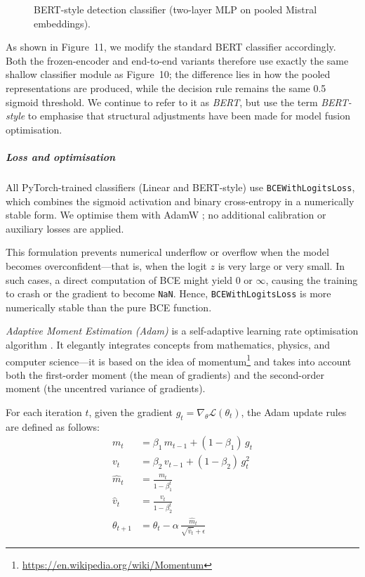 \documentclass[12pt]{article}
\begin{document}
\begin{figure}[H]
\begin{minipage}{1\textwidth}
\begin{adjustwidth}{-2.5cm}{0cm}
\begin{tikzpicture}[node distance=16mm and 22mm, scale=0.9, every node/.style={transform shape}]
\end{tikzpicture}
\end{adjustwidth}
\end{minipage}
\caption{BERT-style detection classifier (two-layer MLP on pooled Mistral embeddings).}
\label{fig:bert-detect-classifier}
\end{figure}

As shown in Figure~11, we modify the standard BERT classifier accordingly. 
Both the frozen-encoder and end-to-end variants therefore use exactly the same shallow classifier module as Figure~10; the difference lies in how the pooled representations are produced, while the decision rule remains the same 0.5 sigmoid threshold.
We continue to refer to it as \textit{BERT}, but use the term \textit{BERT-style} to emphasise that structural adjustments have been made for model fusion optimisation.

\subparagraph{Loss and optimisation}

All PyTorch-trained classifiers (Linear and BERT-style) use \texttt{BCEWithLogitsLoss}, which combines the sigmoid activation and binary cross-entropy in a numerically stable form. 
We optimise them with AdamW \cite{paszke2019pytorch,loshchilov2019adamw}; no additional calibration or auxiliary losses are applied.

This formulation prevents numerical underflow or overflow when the model becomes overconfident\;---\;that is, when the logit $z$ is very large or very small. In such cases, a direct computation of BCE might yield $0$ or $\infty$, causing the training to crash or the gradient to become \texttt{NaN}. Hence, \texttt{BCEWithLogitsLoss} is more numerically stable than the pure BCE function.

\textit{Adaptive Moment Estimation (Adam)} is a self-adaptive learning rate optimisation algorithm \cite{kingma2014adam}. It elegantly integrates concepts from mathematics, physics, and computer science\;---\;it is based on the idea of momentum\footnote{\url{https://en.wikipedia.org/wiki/Momentum}} and takes into account both the first-order moment (the mean of gradients) and the second-order moment (the uncentred variance of gradients).

For each iteration $t$, given the gradient $g_t = \nabla_\theta \mathcal{L}(\theta_t)$,  
the Adam update rules are defined as follows:
\begin{equation}
\begin{aligned}
m_t &= \beta_1 \, m_{t-1} + (1 - \beta_1) \, g_t \\
v_t &= \beta_2 \, v_{t-1} + (1 - \beta_2) \, g_t^2 \\
\hat{m}_t &= \frac{m_t}{1 - \beta_1^t} \\
\hat{v}_t &= \frac{v_t}{1 - \beta_2^t} \\
\theta_{t+1} &= \theta_t - \alpha \, \frac{\hat{m}_t}{\sqrt{\hat{v}_t} + \epsilon}
\end{aligned}
\end{equation}
\end{document}
